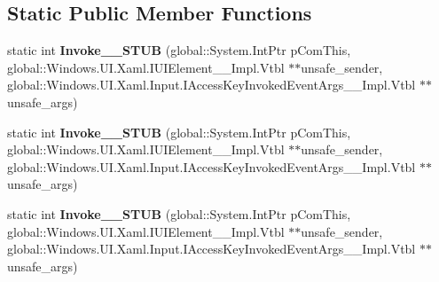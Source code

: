 \subsection*{Static Public Member Functions}
\begin{DoxyCompactItemize}
\item 
\mbox{\label{struct_windows_1_1_foundation_1_1_typed_event_handler___a___windows___u_i___xaml___u_i_element__faa94360fa5e602dc59cfec6def5e27f_a2c646b44fb84b6b76fc1c916dffcf872}} 
static int {\bfseries Invoke\+\_\+\+\_\+\+S\+T\+UB} (global\+::\+System.\+Int\+Ptr p\+Com\+This, global\+::\+Windows.\+U\+I.\+Xaml.\+I\+U\+I\+Element\+\_\+\+\_\+\+Impl.\+Vtbl $\ast$$\ast$unsafe\+\_\+sender, global\+::\+Windows.\+U\+I.\+Xaml.\+Input.\+I\+Access\+Key\+Invoked\+Event\+Args\+\_\+\+\_\+\+Impl.\+Vtbl $\ast$$\ast$unsafe\+\_\+args)
\item 
\mbox{\label{struct_windows_1_1_foundation_1_1_typed_event_handler___a___windows___u_i___xaml___u_i_element__faa94360fa5e602dc59cfec6def5e27f_a2c646b44fb84b6b76fc1c916dffcf872}} 
static int {\bfseries Invoke\+\_\+\+\_\+\+S\+T\+UB} (global\+::\+System.\+Int\+Ptr p\+Com\+This, global\+::\+Windows.\+U\+I.\+Xaml.\+I\+U\+I\+Element\+\_\+\+\_\+\+Impl.\+Vtbl $\ast$$\ast$unsafe\+\_\+sender, global\+::\+Windows.\+U\+I.\+Xaml.\+Input.\+I\+Access\+Key\+Invoked\+Event\+Args\+\_\+\+\_\+\+Impl.\+Vtbl $\ast$$\ast$unsafe\+\_\+args)
\item 
\mbox{\label{struct_windows_1_1_foundation_1_1_typed_event_handler___a___windows___u_i___xaml___u_i_element__faa94360fa5e602dc59cfec6def5e27f_a2c646b44fb84b6b76fc1c916dffcf872}} 
static int {\bfseries Invoke\+\_\+\+\_\+\+S\+T\+UB} (global\+::\+System.\+Int\+Ptr p\+Com\+This, global\+::\+Windows.\+U\+I.\+Xaml.\+I\+U\+I\+Element\+\_\+\+\_\+\+Impl.\+Vtbl $\ast$$\ast$unsafe\+\_\+sender, global\+::\+Windows.\+U\+I.\+Xaml.\+Input.\+I\+Access\+Key\+Invoked\+Event\+Args\+\_\+\+\_\+\+Impl.\+Vtbl $\ast$$\ast$unsafe\+\_\+args)
\item 
\mbox{\label{struct_windows_1_1_foundation_1_1_typed_event_handler___a___windows___u_i___xaml___u_i_element__faa94360fa5e602dc59cfec6def5e27f_a2c646b44fb84b6b76fc1c916dffcf872}} 

\end{DoxyCompactItemize}
